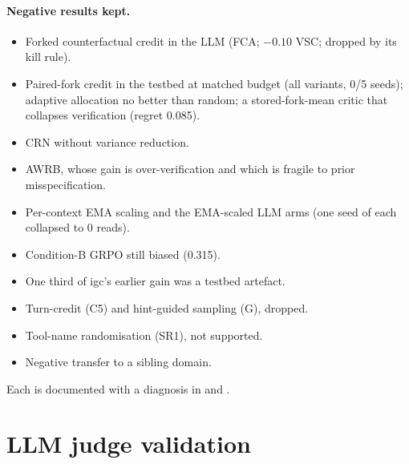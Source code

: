 \begin{table}[h]\centering\small
\caption{Generalisation (feature policy, 51{,}200 episodes, 5 seeds): exact regret on training tasks and on
unseen splits (iid; shifted $p$, $s$, $c$; longer workflows).}\label{tab:l3g}\end{table}

\begin{table}[h]\centering\resizebox{\columnwidth}{!}{}
\caption{Language agent, costed pool (development): share of sampled training rollouts that read, by step window,
and the share of zero-variance groups in steps 150--200 ().}
\label{tab:rr}\end{table}

\paragraph{Negative results kept.}
\begin{itemize}
\item Forked counterfactual credit in the LLM (FCA; $-0.10$ VSC; dropped by its kill rule).
\item Paired-fork credit in the testbed at matched budget (all variants, 0/5 seeds); adaptive allocation no better
than random; a stored-fork-mean critic that collapses verification (regret 0.085).
\item CRN without variance reduction.
\item AWRB, whose gain is over-verification and which is fragile to prior misspecification.
\item Per-context EMA scaling and the EMA-scaled LLM arms (one seed of each collapsed to 0 reads).
\item Condition-B GRPO still biased (0.315).
\item One third of igc's earlier gain was a testbed artefact.
\item Turn-credit (C5) and hint-guided sampling (G), dropped.
\item Tool-name randomisation (SR1), not supported.
\item Negative transfer to a sibling domain.
\end{itemize}
Each is documented with a diagnosis in  and .

\section{LLM judge validation}\label{app2:judge}


